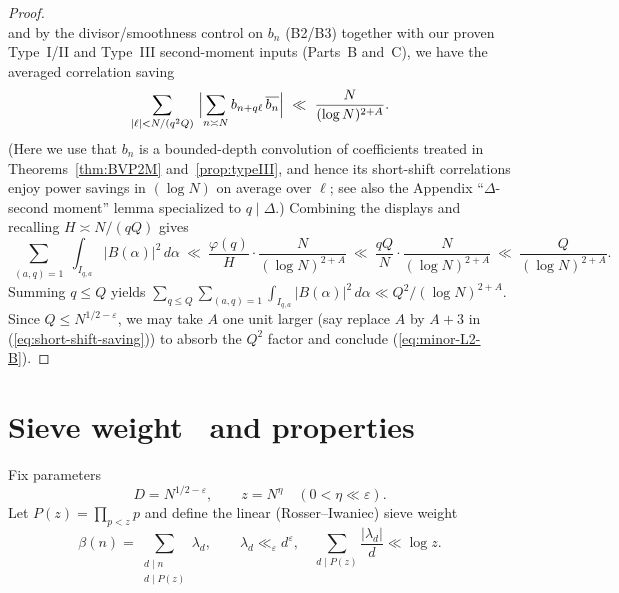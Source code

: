 \documentclass[11pt]{article}
\def\eqref#1{(\ref{#1})}%
\theoremstyle{definition}
\theoremstyle{remark}
\numberwithin{equation}{part}
\begin{document}
\begin{proof}
\[	\]
	and by the divisor/smoothness control on $b_n$ (B2/B3) together with our proven Type~I/II and Type~III second-moment inputs (Parts~B and~C), we have the averaged correlation saving
	\begin{equation}\label{eq:short-shift-saving}
		\sum_{|\ell|<N/(q^2 Q)}\ \Bigl|\sum_{n\asymp N} b_{n+q\ell}\,\overline{b_n}\Bigr|
		\ \ll\ \frac{N}{(\log N)^{2+A}}.
	\end{equation}
	(Here we use that $b_n$ is a bounded-depth convolution of coefficients treated in Theorems~\ref{thm:BVP2M} and~\ref{prop:typeIII}, and hence its short-shift correlations enjoy power savings in $(\log N)$ on average over $\ell$; see also the Appendix ``$\Delta$-second moment'' lemma specialized to $q\mid \Delta$.) Combining the displays and recalling $H\asymp N/(qQ)$ gives
	\[
		\sum_{\substack{(a,q)=1}}\int_{I_{q,a}}\!|B(\alpha)|^2\,d\alpha
		\ \ll\ \frac{\varphi(q)}{H}\cdot \frac{N}{(\log N)^{2+A}}
		\ \ll\ \frac{qQ}{N}\cdot \frac{N}{(\log N)^{2+A}}
		\ \ll\ \frac{Q}{(\log N)^{2+A}}.
	\]
	Summing $q\le Q$ yields
	$\sum_{q\le Q}\sum_{(a,q)=1}\int_{I_{q,a}}|B(\alpha)|^2\,d\alpha
		\ll Q^2/(\log N)^{2+A}$.
	Since $Q\le N^{1/2-\varepsilon}$, we may take $A$ one unit larger (say replace $A$ by $A+3$ in \eqref{eq:short-shift-saving}) to absorb the $Q^2$ factor and conclude \eqref{eq:minor-L2-B}.
\end{proof}

\section{Sieve weight \textbeta\ and properties}

Fix parameters
\[
	D=N^{1/2-\varepsilon},\qquad z=N^{\eta}\quad(0<\eta\ll \varepsilon).
\]
Let $P(z)=\prod_{p<z}p$ and define the linear (Rosser--Iwaniec) sieve weight
\[
	\beta(n)=\sum_{\substack{d\mid n\\ d\mid P(z)}} \lambda_d,\qquad
	\lambda_d\ll_\varepsilon d^{\varepsilon},\quad
	\sum_{d\mid P(z)}\frac{|\lambda_d|}{d}\ll \log z.
\]
\end{document}
